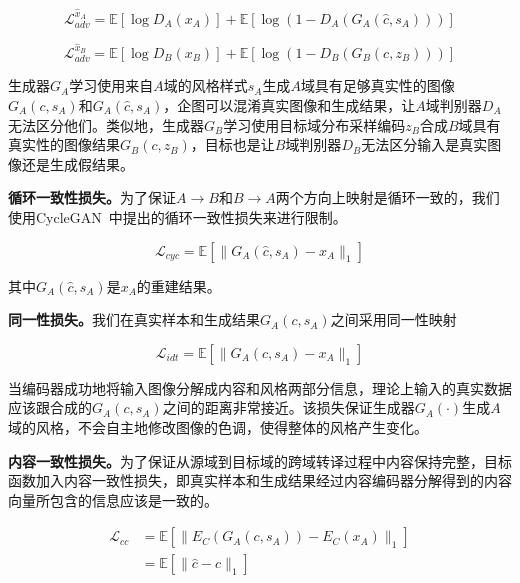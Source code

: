 \begin{equation}
\label{equ:adv_a}
\mathcal{L}_{adv}^{\hat{x}_A} = \mathbb{E}[\log D_A(x_A)] + \mathbb{E}[\log(1-D_A(G_A(\hat{c},s_A)))]
\end{equation}

\begin{equation}
\label{equ:adv_b}
\mathcal{L}_{adv}^{\hat{x}_B} = \mathbb{E}[\log D_B(x_B)] + \mathbb{E}[\log(1-D_B(G_B(c,z_B)))]
\end{equation}

生成器$G_A$学习使用来自$A$域的风格样式$s_A$生成$A$域具有足够真实性的图像$G_A(c,s_A)$和$G_A(\hat{c},s_A)$，企图可以混淆真实图像和生成结果，让$A$域判别器$D_A$无法区分他们。类似地，生成器$G_B$学习使用目标域分布采样编码$z_B$合成$B$域具有真实性的图像结果$G_B(c,z_B)$，目标也是让$B$域判别器$D_B$无法区分输入是真实图像还是生成假结果。

\textbf{循环一致性损失。}为了保证$A \rightarrow B$和$B \rightarrow A$两个方向上映射是循环一致的，我们使用CycleGAN~\cite{zhu2017unpaired}中提出的循环一致性损失来进行限制。

\begin{equation}
\label{equ:cycle}
\mathcal{L}_{cyc} = \mathbb{E}[\| G_A(\hat{c}, s_A) - x_A \|_1]
\end{equation}

其中$G_A(\hat{c}, s_A)$是$x_A$的重建结果。

\textbf{同一性损失。}我们在真实样本和生成结果$G_A(c,s_A)$之间采用同一性映射

\begin{equation}
\label{equ:idt}
\mathcal{L}_{idt} = \mathbb{E}[\| G_A(c, s_A) - x_A \|_1]
\end{equation}

当编码器成功地将输入图像分解成内容和风格两部分信息，理论上输入的真实数据应该跟合成的$G_A(c,s_A)$之间的距离非常接近。该损失保证生成器$G_A(\cdot)$生成$A$域的风格，不会自主地修改图像的色调，使得整体的风格产生变化。

\textbf{内容一致性损失。}为了保证从源域到目标域的跨域转译过程中内容保持完整，目标函数加入内容一致性损失，即真实样本和生成结果经过内容编码器分解得到的内容向量所包含的信息应该是一致的。

\begin{equation}
\label{equ:cc}
\begin{aligned}
\mathcal{L}_{cc} & = \mathbb{E}[\| E_C(G_A(c, s_A)) - E_C(x_A) \|_1] \\
       & = \mathbb{E}[\| \hat{c} - c \|_1]
\end{aligned}
\end{equation}

